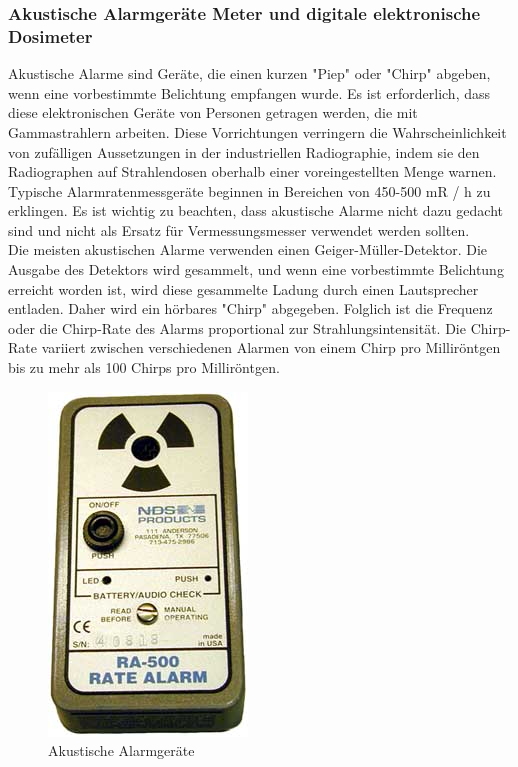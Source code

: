 {\subsubsection{Akustische Alarmgeräte Meter und digitale elektronische Dosimeter}
Akustische Alarme sind Geräte, die einen kurzen "Piep" oder "Chirp" abgeben, wenn eine vorbestimmte Belichtung empfangen wurde.
Es ist erforderlich, dass diese elektronischen Geräte von Personen getragen werden, die mit Gammastrahlern arbeiten. Diese Vorrichtungen verringern die Wahrscheinlichkeit von zufälligen Aussetzungen in der industriellen Radiographie, indem sie den Radiographen auf Strahlendosen oberhalb einer voreingestellten Menge warnen. Typische Alarmratenmessgeräte beginnen in Bereichen von 450-500 mR / h zu erklingen. Es ist wichtig zu beachten, dass akustische Alarme nicht dazu gedacht sind und nicht als Ersatz für Vermessungsmesser verwendet werden sollten.\\
Die meisten akustischen Alarme verwenden einen Geiger-Müller-Detektor. Die Ausgabe des Detektors wird gesammelt, und wenn eine vorbestimmte Belichtung erreicht worden ist, wird diese gesammelte Ladung durch einen Lautsprecher entladen. Daher wird ein hörbares "Chirp" abgegeben. Folglich ist die Frequenz oder die Chirp-Rate des Alarms proportional zur Strahlungsintensität. Die Chirp-Rate variiert zwischen verschiedenen Alarmen von einem Chirp pro Milliröntgen bis zu mehr als 100 Chirps pro Milliröntgen.
\begin{figure}[htb]
\centering
   \includegraphics[scale=0.3]{img/alarm.jpg}
  \caption{Akustische Alarmgeräte}
  \label{fig:Alarmgeräte Meter}
\end{figure}
}
